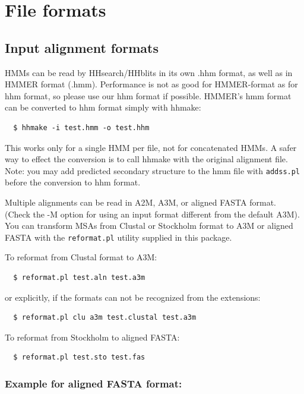 \documentclass[11pt,a4paper]{article}
\begin{document}
\section{File formats}

\subsection{Input alignment formats} \label{aliformats}

HMMs can be read by HHsearch/HHblits in its own .hhm format, as well as in HMMER format (.hmm).
Performance is not as good for HMMER-format as for hhm format, so please use 
our hhm format if possible. HMMER's hmm format can be converted to hhm format simply 
with hhmake:
\begin{verbatim}
  $ hhmake -i test.hmm -o test.hhm
\end{verbatim}

This works only for a single HMM per file, not for concatenated HMMs. A safer way to 
effect the conversion is to call hhmake with the original alignment file. Note: you 
may add predicted secondary structure to the hmm file with \verb`addss.pl` before the 
conversion to hhm format.

Multiple alignments can be read in A2M, A3M, or aligned FASTA format. (Check the -M option for 
using an input format different from the default A3M). You can transform MSAs 
from Clustal or Stockholm format to A3M or aligned FASTA with the \verb`reformat.pl` utility 
supplied in this package. 

To reformat from Clustal format to A3M:
\begin{verbatim}
  $ reformat.pl test.aln test.a3m
\end{verbatim}
or explicitly, if the formats can not be recognized from the extensions:
\begin{verbatim}
  $ reformat.pl clu a3m test.clustal test.a3m
\end{verbatim}
To reformat from Stockholm to aligned FASTA:
\begin{verbatim}
  $ reformat.pl test.sto test.fas
\end{verbatim}


\subsubsection*{Example for aligned FASTA format:}
\end{document}
